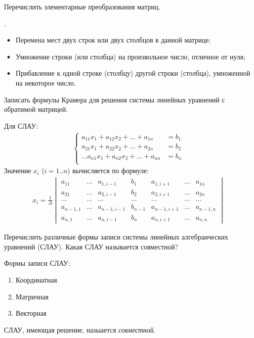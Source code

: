 \begin{question}
  Перечислить элементарные преобразования матриц.
\end{question} 
\begin{answer}.
  \begin{itemize}
    \item Перемена мест двух строк или двух столбцов в данной матрице;
    \item Умножение строки (или столбца) на произвольное число, отличное от нуля;
    \item Прибавление к одной строке (столбцу) другой строки (столбца), умноженной на некоторое число.
  \end{itemize}
\end{answer} 

\begin{question}
  Записать формулы Крамера для решения системы линейных уравнений с обратимой матрицей.
\end{question} 
\begin{answer}
  Для СЛАУ:
  \begin{align*}
    \begin{cases}  
      a_{11}x_1 + a_{12}x_2 + \ldots + a_{1n} &= b_1 \\
      a_{21}x_1 + a_{22}x_2 + \ldots + a_{2n} &= b_2 \\
      \ldots
      a_{n1}x_1 + a_{n2}x_2 + \ldots + a_{nn} &= b_n \\
    \end{cases}
  \end{align*}
  Значение $x_i$ ($i=1..n$) вычисляется по формуле:
  \begin{gather*}
    x_i = \frac{1}{\Delta} 
    \begin{vmatrix}
      a_{11} & \ldots & a_{1,i-1} & b_1 & a_{1,i+1} & \ldots & a_{1n} \\ 
      a_{21} & \ldots & a_{2,i-1} & b_2 & a_{2,i+1} & \ldots & a_{2n} \\ 
      \ldots & \ldots & \ldots & \ldots & \ldots & \ldots & \ldots \\
      a_{n-1,1} & \ldots & a_{n-1,i-1} & b_{n-1} & a_{n-1,i+1} & \ldots & a_{n-1,n} \\ 
      a_{n,1} & \ldots & a_{n,i-1} & b_{n} & a_{n,i+1} & \ldots & a_{n,n}
    \end{vmatrix}
  \end{gather*}
\end{answer} 

\begin{question}
  Перечислить различные формы записи системы линейных алгебраических уравнений (СЛАУ). Какая СЛАУ называется совместной?
\end{question}
\begin{answer}
  Формы записи СЛАУ:
  \begin{enumerate}
    \item Координатная
    \item Матричная
    \item Векторная
  \end{enumerate}
  СЛАУ, имеющая решение, назыается \textit{совместной}.
\end{answer} 

